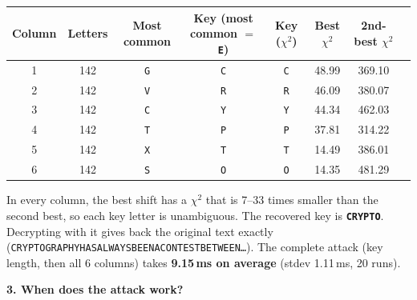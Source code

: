 \documentclass[a4paper, 10pt]{article}
\begin{document}
\begin{problem}
\begin{subproblems_alpha}
\begin{solution}
		      \begin{center}
			      \footnotesize
			      \setlength{\tabcolsep}{3.5pt}
			      \begin{tabular}{cccccccc}
				      \toprule
				      Column & Letters & Most common & Key (most common $=$ \texttt{E}) & Key ($\chi^2$) & Best $\chi^2$ & 2nd-best $\chi^2$ \\
				      \midrule
				      1      & 142     & \texttt{G}  & \texttt{C}                       & \texttt{C}     & 48.99         & 369.10            \\
				      2      & 142     & \texttt{V}  & \texttt{R}                       & \texttt{R}     & 46.09         & 380.07            \\
				      3      & 142     & \texttt{C}  & \texttt{Y}                       & \texttt{Y}     & 44.34         & 462.03            \\
				      4      & 142     & \texttt{T}  & \texttt{P}                       & \texttt{P}     & 37.81         & 314.22            \\
				      5      & 142     & \texttt{X}  & \texttt{T}                       & \texttt{T}     & 14.49         & 386.01            \\
				      6      & 142     & \texttt{S}  & \texttt{O}                       & \texttt{O}     & 14.35         & 481.29            \\
				      \bottomrule
			      \end{tabular}
		      \end{center}
		      In every column, the best shift has a $\chi^2$ that is 7--33 times smaller than the second best, so each key letter is unambiguous.
		      The recovered key is \textbf{\texttt{CRYPTO}}.
		      Decrypting with it gives back the original text exactly
		      (\texttt{CRYPTOGRAPHYHASALWAYSBEENACONTESTBETWEEN\ldots}).
		      The complete attack (key length, then all 6 columns) takes \textbf{9.15\,ms on average} (stdev 1.11\,ms, 20 runs).

		      \par\medskip\noindent\textbf{\large 3. When does the attack work?}


\end{solution}
\end{subproblems_alpha}
\end{problem}
\end{document}
